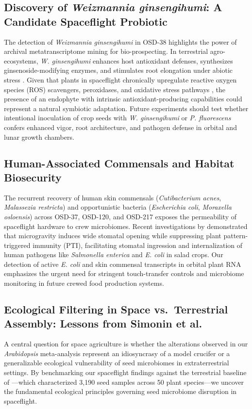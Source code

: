 \subsection{Discovery of \textit{Weizmannia ginsengihumi}: A Candidate Spaceflight Probiotic}
The detection of \textit{Weizmannia ginsengihumi} in OSD-38 highlights the power of archival metatranscriptome mining for bio-prospecting. In terrestrial agro-ecosystems, \textit{W. ginsengihumi} enhances host antioxidant defenses, synthesizes ginsenoside-modifying enzymes, and stimulates root elongation under abiotic stress \citep{kim2020weizmannia}. Given that plants in spaceflight chronically upregulate reactive oxygen species (ROS) scavengers, peroxidases, and oxidative stress pathways \citep{choi2019variation,kruse2020spaceflight}, the presence of an endophyte with intrinsic antioxidant-producing capabilities could represent a natural symbiotic adaptation. Future experiments should test whether intentional inoculation of crop seeds with \textit{W. ginsengihumi} or \textit{P. fluorescens} confers enhanced vigor, root architecture, and pathogen defense in orbital and lunar growth chambers.

\subsection{Human-Associated Commensals and Habitat Biosecurity}
The recurrent recovery of human skin commensals (\textit{Cutibacterium acnes}, \textit{Malassezia restricta}) and opportunistic bacteria (\textit{Escherichia coli}, \textit{Moraxella osloensis}) across OSD-37, OSD-120, and OSD-217 exposes the permeability of spaceflight hardware to crew microbiomes. Recent investigations by \citet{totsline2023microgravity,totsline2024simulated} demonstrated that microgravity induces wide stomatal opening while suppressing plant pattern-triggered immunity (PTI), facilitating stomatal ingression and internalization of human pathogens like \textit{Salmonella enterica} and \textit{E. coli} in salad crops. Our detection of active \textit{E. coli} and skin commensal transcripts in orbital plant RNA emphasizes the urgent need for stringent touch-transfer controls and microbiome monitoring in future crewed food production systems.

\subsection{Ecological Filtering in Space vs.\ Terrestrial Assembly: Lessons from Simonin et al.}
A central question for space agriculture is whether the alterations observed in our \textit{Arabidopsis} meta-analysis represent an idiosyncrasy of a model crucifer or a generalizable ecological vulnerability of seed microbiomes in extraterrestrial settings. By benchmarking our spaceflight findings against the terrestrial baseline of \citet{simonin2022seed}—which characterized 3,190 seed samples across 50 plant species—we uncover the fundamental ecological principles governing seed microbiome disruption in spaceflight.

